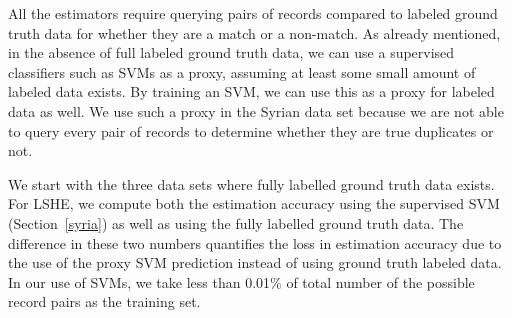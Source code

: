 \documentclass[aoas]{imsart}
\begin{document}
All the estimators require querying pairs of records compared to labeled ground truth data for whether they are a match or a non-match. As already mentioned, in the absence of full labeled ground truth data, we can use a supervised classifiers such as SVMs as a proxy, assuming at least some small amount of labeled data exists. By training an SVM, we can use this as a proxy for labeled data as well. We use such a proxy in the Syrian data set because we are not able to query every pair of records to determine whether they are true duplicates or not.



We start with the three data sets where fully labelled ground truth data exists. For LSHE, we compute both the estimation accuracy using the supervised SVM (Section~\ref{syria}) as well as using the fully labelled ground truth data. The difference in these two numbers quantifies the loss in estimation accuracy due to the use of the proxy SVM prediction instead of using ground truth labeled data. In our use of SVMs, we take less than 0.01$\%$ of total number of the possible record pairs as the training set.
\end{document}
